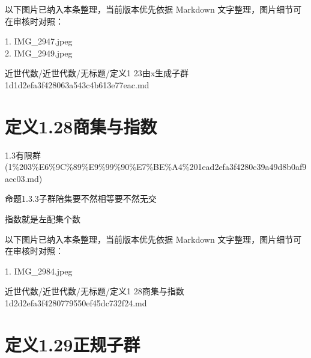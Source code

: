 \begin{note}[关联图片]
以下图片已纳入本条整理，当前版本优先依据 Markdown 文字整理，图片细节可在审核时对照：

1. IMG\_2947.jpeg\\
2. IMG\_2949.jpeg\\

\end{note}

\begin{note}[来源路径]

近世代数/近世代数/无标题/定义1 23由x生成子群 1d1d2efa3f428063a543c4b613e77eac.md

\end{note}

\section*{定义1.28商集与指数}

\begin{note}[来源上级主题]

1.3有限群 (1\%203\%E6\%9C\%89\%E9\%99\%90\%E7\%BE\%A4\%201ead2efa3f4280c39a49d8b0af9aec03.md)

\end{note}

\begin{definition}[定义1.28商集与指数]

命题1.3.3子群陪集要不然相等要不然无交

指数就是左配集个数

\end{definition}

\begin{note}[关联图片]
以下图片已纳入本条整理，当前版本优先依据 Markdown 文字整理，图片细节可在审核时对照：

1. IMG\_2984.jpeg\\

\end{note}

\begin{note}[来源路径]

近世代数/近世代数/无标题/定义1 28商集与指数 1d2d2efa3f4280779550ef45dc732f24.md

\end{note}

\section*{定义1.29正规子群}

